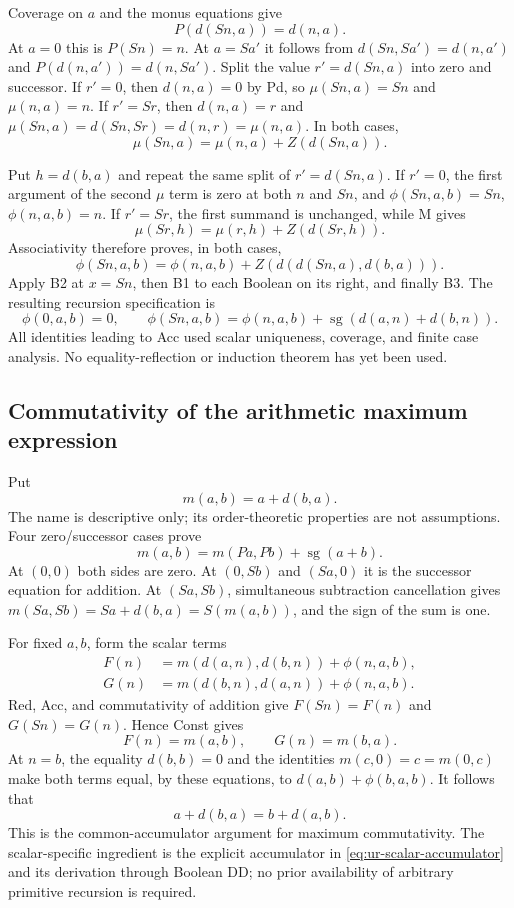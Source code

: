 \documentclass[11pt]{article}
\begin{document}
Coverage on $a$ and the monus equations give
\[
                         P(d(Sn,a))=d(n,a).
 \tag{Pd}
\]
At $a=0$ this is $P(Sn)=n$. At $a=Sa'$ it follows from
$d(Sn,Sa')=d(n,a')$ and $P(d(n,a'))=d(n,Sa')$.
Split the value $r'=d(Sn,a)$ into zero and successor.
If $r'=0$, then $d(n,a)=0$ by Pd, so
$\mu(Sn,a)=Sn$ and $\mu(n,a)=n$.
If $r'=Sr$, then $d(n,a)=r$ and
$\mu(Sn,a)=d(Sn,Sr)=d(n,r)=\mu(n,a)$.
In both cases,
\[
             \mu(Sn,a)=\mu(n,a)+Z(d(Sn,a)).              \tag{M}
\]

Put $h=d(b,a)$ and repeat the same split of $r'=d(Sn,a)$.
If $r'=0$, the first argument of the second $\mu$ term is zero at both
$n$ and $Sn$, and $\phi(Sn,a,b)=Sn$, $\phi(n,a,b)=n$.
If $r'=Sr$, the first summand is unchanged, while M gives
\[
                 \mu(Sr,h)=\mu(r,h)+Z(d(Sr,h)).
\]
Associativity therefore proves, in both cases,
\[
 \phi(Sn,a,b)=\phi(n,a,b)+Z(d(d(Sn,a),d(b,a))).
\]
Apply B2 at $x=Sn$, then B1 to each Boolean on its right, and finally B3.
The resulting recursion specification is
\[
 \boxed{\quad
 \phi(0,a,b)=0,\qquad
 \phi(Sn,a,b)=\phi(n,a,b)+\operatorname{sg}(d(a,n)+d(b,n)).
 \quad}                                                   \tag{Acc}
\]
All identities leading to Acc used scalar uniqueness, coverage, and
finite case analysis. No equality-reflection or induction theorem has
yet been used.

\subsection{Commutativity of the arithmetic maximum expression}

Put
\[
                              m(a,b)=a+d(b,a).
\]
The name is descriptive only; its order-theoretic properties are not
assumptions. Four zero/successor cases prove
\[
                  m(a,b)=m(Pa,Pb)+\operatorname{sg}(a+b).
 \tag{Red}\label{eq:ur-max-diagonal-reduction}
\]
At $(0,0)$ both sides are zero. At $(0,Sb)$ and $(Sa,0)$ it is the
successor equation for addition. At $(Sa,Sb)$, simultaneous subtraction
cancellation gives
$m(Sa,Sb)=Sa+d(b,a)=S(m(a,b))$, and the sign of the sum is one.

For fixed $a,b$, form the scalar terms
\begin{align*}
 F(n)&=m(d(a,n),d(b,n))+\phi(n,a,b),\\
 G(n)&=m(d(b,n),d(a,n))+\phi(n,a,b).
\end{align*}
Red, Acc, and commutativity of addition give $F(Sn)=F(n)$ and
$G(Sn)=G(n)$. Hence Const gives
\[
                          F(n)=m(a,b),\qquad G(n)=m(b,a).
\]
At $n=b$, the equality $d(b,b)=0$ and the identities
$m(c,0)=c=m(0,c)$ make both terms equal, by these equations, to
$d(a,b)+\phi(b,a,b)$. It follows that
\[
                    \boxed{\ a+d(b,a)=b+d(a,b).\ }       \tag{Max}
\]
This is the common-accumulator argument for maximum commutativity.
The scalar-specific ingredient is the explicit accumulator in
\eqref{eq:ur-scalar-accumulator} and its derivation through Boolean DD;
no prior availability of arbitrary primitive recursion is required.
\end{document}
